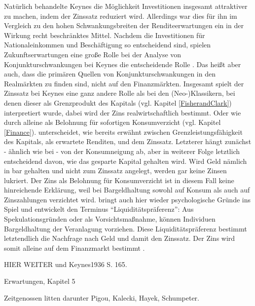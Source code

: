 Natürlich behandelte Keynes die Möglichkeit Investitionen insgesamt attraktiver zu machen, indem der Zinssatz reduziert wird. Allerdings war dies für ihn im Vergleich zu den hohen Schwankungsbreiten der Renditeerwartungen ein in der Wirkung recht beschränktes Mittel. Nachdem die Investitionen für Nationaleinkommen und Beschäftigung so entscheidend sind, spielen Zukunftserwartungen eine große Rolle bei der Analyse von Konjunkturschwankungen bei Keynes die entscheidende Rolle \parencite[S. 313]{Keynes1936}. Das heißt aber auch, dass die primären Quellen von Konjunkturschwankungen in den Realmärkten zu finden sind, nicht auf den Finanzmärkten. Insgesamt spielt der Zinssatz bei Keynes eine ganz andere Rolle als bei den (Neo-)Klassikern, bei denen dieser als Grenzprodukt des Kapitals (vgl. Kapitel \ref{FisherandClark}) interpretiert wurde, dabei wird der Zins realwirtschaftlich bestimmt. Oder wie durch \textcite{Fisher1930} alleine als Belohnung für sofortigen Konsumverzicht (vgl. Kapitel \ref{Finance}). \textcite[S. 165]{Keynes1936} unterscheidet, wie bereits erwähnt zwischen Grenzleistungsfähigkeit des Kapitals, als erwartete Renditen, und dem Zinssatz. Letzterer hängt zunächst - ähnlich wie bei \textcite{Fisher1930} - von der Konsumneigung ab, aber in weiterer Folge letztlich entscheidend davon, wie das gesparte Kapital gehalten wird. Wird Geld nämlich in bar gehalten und nicht zum Zinssatz angelegt, werden gar keine Zinsen lukriert. Der Zins als Belohnung für Konsumverzicht ist in diesem Fall keine hinreichende Erklärung, weil bei Bargeldhaltung sowohl auf Konsum als auch auf Zinszahlungen verzichtet wird. \textcite[S. 194]{Keynes1936} bringt auch hier wieder psychologische Gründe ins Spiel und entwickelt den Terminus "`Liquiditätspräferenz"': Aus Spekulationsgründen oder als Vorsichtsmaßnahme, können Individuen Bargeldhaltung der Veranlagung vorziehen. Diese Liquiditätspräferenz bestimmt letztendlich die Nachfrage nach Geld und damit den Zinssatz. Der Zins wird somit alleine auf dem Finanzmarkt bestimmt \parencite[S. 62]{Snowdon2005}.



HIER WEITER \parencite[S. 53]{Snowdon2005} und Keynes1936 S. 165.



Erwartungen, Kapitel 5



Zeitgenossen litten darunter Pigou, Kalecki, Hayek, Schumpeter. 








